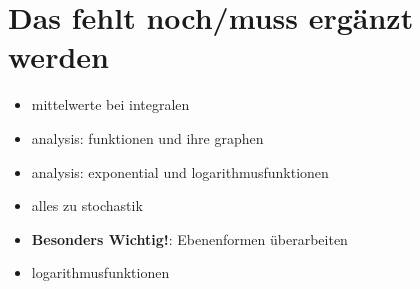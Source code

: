 \chapter{Das fehlt noch/muss ergänzt werden}
\begin{itemize}
    \item mittelwerte bei integralen
    \item analysis: funktionen und ihre graphen
    \item analysis: exponential und logarithmusfunktionen
    \item alles zu stochastik
    \item \textbf{Besonders Wichtig!}: Ebenenformen überarbeiten 
    \item logarithmusfunktionen
\end{itemize}
